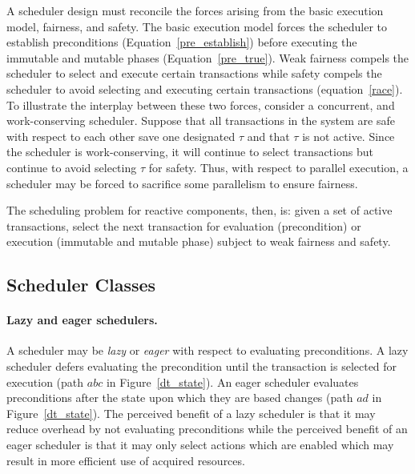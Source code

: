 A scheduler design must reconcile the forces arising from the basic execution model, fairness, and safety.
The basic execution model forces the scheduler to establish preconditions (Equation~\ref{pre_establish}) before executing the immutable and mutable phases (Equation~\ref{pre_true}).
Weak fairness compels the scheduler to select and execute certain transactions while safety compels the scheduler to avoid selecting and executing certain transactions (equation~\ref{race}).
To illustrate the interplay between these two forces, consider a concurrent, and work-conserving scheduler.
Suppose that all transactions in the system are safe with respect to each other save one designated $\tau$ and that $\tau$ is not active.
Since the scheduler is work-conserving, it will continue to select transactions but continue to avoid selecting $\tau$ for safety.
Thus, with respect to parallel execution, a scheduler may be forced to sacrifice some parallelism to ensure fairness.

The scheduling problem for reactive components, then, is:  given a set of active transactions, select the next transaction for evaluation (precondition) or execution (immutable and mutable phase) subject to weak fairness and safety.

\subsection{Scheduler Classes}

\paragraph{Lazy and eager schedulers.}
A scheduler may be \emph{lazy} or \emph{eager} with respect to evaluating preconditions.
A lazy scheduler defers evaluating the precondition until the transaction is selected for execution (path $abc$ in Figure~\ref{dt_state}).
An eager scheduler evaluates preconditions after the state upon which they are based changes (path $ad$ in Figure~\ref{dt_state}).
The perceived benefit of a lazy scheduler is that it may reduce overhead by not evaluating preconditions while the perceived benefit of an eager scheduler is that it may only select actions which are enabled which may result in more efficient use of acquired resources.

